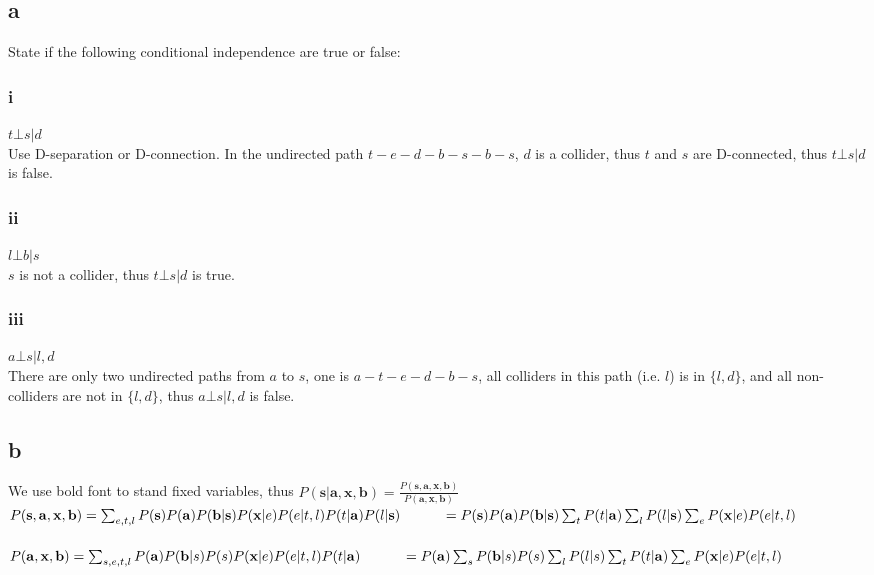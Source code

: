 \documentclass[12pt]{amsart}
\begin{document}
\subsection*{a}
State if the following conditional independence are true or false:
\subsubsection*{i} $t\bot s|d$\\
Use D-separation or D-connection. 
In the undirected path $t-e-d-b-s-b-s$, $d$ is a collider, thus $t$ and $s$ are D-connected, thus $t\bot s|d$ is false.
\subsubsection*{ii} $l\bot b|s$\\
$s$ is not a collider, thus $t\bot s|d$ is true.
\subsubsection*{iii} $a\bot s|l,d$\\
There are only two undirected paths from $a$ to $s$, one is  $a-t-e-d-b-s$, all colliders in this path (i.e. $l$) is in $\{l,d\}$, and all non-colliders are not in $\{l,d\}$, thus $a\bot s|l,d$ is false.

\subsection*{b}
We use bold font to stand fixed variables, thus
$P(\mathbf{s}|\mathbf{a},\mathbf{x,b})=\frac{P(\mathbf{s,a,x,b})}{P(\mathbf{a,x,b})}$\\
$P(\mathbf{s,a,x,b})
=\sum_{e,t,l}P(\mathbf{s})P(\mathbf{a})P(\mathbf{b|s})P(\mathbf{x}|e)P(e|t,l)P(t|\mathbf{a})P(l|\mathbf{s})
\\ \indent \indent =P(\mathbf{s})P(\mathbf{a})P(\mathbf{b|s})\sum_{t}P(t|\mathbf{a})
\sum_{l}P(l|\mathbf{s})
\sum_{e}P(\mathbf{x}|e)P(e|t,l)$\\
\\
$P(\mathbf{a,x,b})
=\sum_{s,e,t,l}P(\mathbf{a})P(\mathbf{b}|s)P(s)P(\mathbf{x}|e)P(e|t,l)P(t|\mathbf{a})
\\ \indent \indent =P(\mathbf{a})
\sum_{s}P(\mathbf{b}|s)P(s)
\sum_{l}P(l|s)
\sum_{t}P(t|\mathbf{a})
\sum_{e}P(\mathbf{x}|e)P(e|t,l)
$
\end{document}
